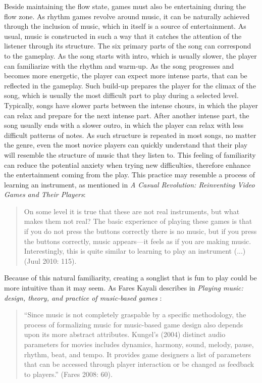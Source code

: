 Beside maintaining the flow state, games must also be entertaining during the flow zone. As rhythm games revolve around music, it can be naturally achieved through the inclusion of music, which in itself is a source of entertainment. As usual, music is constructed in such a way that it catches the attention of the listener through its structure. The six primary parts of the song can correspond to the gameplay. As the song starts with intro, which is usually slower, the player can familiarize with the rhythm and warm-up. As the song progresses and becomes more energetic, the player can expect more intense parts, that can be reflected in the gameplay. Such build-up prepares the player for the climax of the song, which is usually the most difficult part to play during a selected level. Typically, songs have slower parts between the intense chours, in which the player can relax and prepare for the next intense part. After another intense part, the song usually ends with a slower outro, in which the player can relax with less difficult patterns of notes. As such structure is repeated in most songs, no matter the genre, even the most novice players can quickly understand that their play will resemble the structure of music that they listen to. This feeling of familiarity can reduce the potential anxiety when trying new difficulties, therefore enhance the entertainment coming from the play. This practice may resemble a process of learning an instrument, as mentioned in \textit{A Casual Revolution: Reinventing Video Games and Their Players}\cite{casualrevolution}:
\begin{quote}
    On some level it is true that these are not real instruments, but what makes them not real? The basic experience of playing these games is that if you do not press the buttons correctly there is no music, but if you press the buttons correctly, music appears—it feels as if you are making music. Interestingly, this is quite similar to learning to play an instrument (...) (Juul 2010: 115).
\end{quote}
Because of this natural familiarity, creating a songlist that is fun to play could be more intuitive than it may seem. As Fares Kayali describes in \textit{Playing music: design, theory, and practice of music-based games} \cite{faresplayingmusic}: 
\begin{quote}
    “Since music is not completely graspable by a specific methodology, the process of formalizing music for music-based game design also depends upon its more abstract attributes. Kungel’s (2004) distinct audio parameters for movies includes dynamics, harmony, sound, melody, pause, rhythm, beat, and tempo. It provides game designers a list of parameters that can be accessed through player interaction or be changed as feedback to players.” (Fares 2008: 60).
\end{quote}
